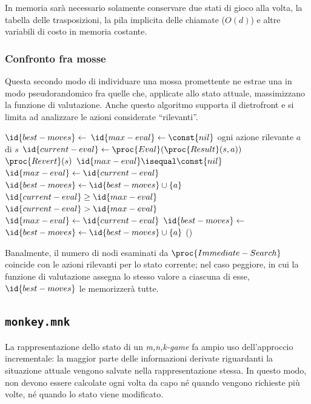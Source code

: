 \documentclass{article}
\begin{document}
In memoria sarà necessario solamente conservare due stati di gioco alla volta,
la tabella delle trasposizioni, la pila implicita delle chiamate ($O(d)$) e
altre variabili di costo in memoria costante.

\subsubsection{Confronto fra mosse}

Questa secondo modo di individuare una mossa promettente ne estrae una in modo
pseudorandomico fra quelle che, applicate allo stato attuale, massimizzano la
funzione di valutazione. Anche questo algoritmo supporta il dietrofront e si
limita ad analizzare le azioni considerate ``rilevanti''.

\begin{codebox}
  \li  $\id{best-moves} \gets$
       {\emph{}}
  \li  $\id{max-eval} \gets \const{nil}$
  \li \For ogni azione rilevante $a$ di $s$
  \li   \Do
          $\id{current-eval} \gets \proc{Eval}(\proc{Result}(s, a))$
  \li     $\proc{Revert}(s)$
  \li     \If $\id{max-eval} \isequal \const{nil}$
  \li       \Then
              $\id{max-eval} \gets \id{current-eval}$
  \li         $\id{best-moves} \gets \id{best-moves} \cup \{ a \}$
  \li     \ElseIf $\id{current-eval} \geq \id{max-eval}$
  \li       \Then
              \If $\id{current-eval} > \id{max-eval}$
  \li           \Then
                  $\id{max-eval} \gets \id{current-eval}$
  \li             $\id{best-moves} \gets$
                  {\emph{}}
                \End
  \li         $\id{best-moves} \gets \id{best-moves} \cup \{ a \}$
          \End
        \End
  \li  \Return {}()
\end{codebox}

Banalmente, il numero di nodi esaminati da $\proc{Immediate-Search}$ coincide
con le azioni rilevanti per lo stato corrente; nel caso peggiore, in cui la
funzione di valutazione assegna lo stesso valore a ciascuna di esse,
$\id{best-moves}$ le memorizzerà tutte.

\subsection{\texttt{monkey.mnk}}

La rappresentazione dello stato di un \emph{m,n,k-game} fa ampio uso
dell'approccio incrementale: la maggior parte delle informazioni derivate
riguardanti la situazione attuale vengono salvate nella rappresentazione stessa.
In questo modo, non devono essere calcolate ogni volta da capo né quando vengono
richieste più volte, né quando lo stato viene modificato.
\end{document}
